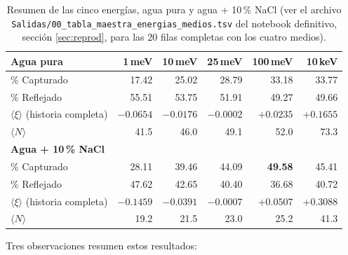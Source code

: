 \documentclass[11pt,a4paper]{article}
\begin{document}
\begin{table}[H]
\centering
\small
\begin{tabularx}{\linewidth}{X r r r r r}
\toprule
\textbf{Agua pura} & \textbf{1\,meV} & \textbf{10\,meV} & \textbf{25\,meV} & \textbf{100\,meV} & \textbf{10\,keV} \\
\midrule
\% Capturado & 17.42 & 25.02 & 28.79 & 33.18 & 33.77 \\
\% Reflejado & 55.51 & 53.75 & 51.91 & 49.27 & 49.66 \\
$\langle\xi\rangle$ (historia completa) & $-0.0654$ & $-0.0176$ & $-0.0002$ & $+0.0235$ & $+0.1655$ \\
$\langle N\rangle$ & 41.5 & 46.0 & 49.1 & 52.0 & 73.3 \\
\midrule
\textbf{Agua + 10\,\% NaCl} & & & & & \\
\midrule
\% Capturado & 28.11 & 39.46 & 44.09 & \textbf{49.58} & 45.41 \\
\% Reflejado & 47.62 & 42.65 & 40.40 & 36.68 & 40.72 \\
$\langle\xi\rangle$ (historia completa) & $-0.1459$ & $-0.0391$ & $-0.0007$ & $+0.0507$ & $+0.3088$ \\
$\langle N\rangle$ & 19.2 & 21.5 & 23.0 & 25.2 & 41.3 \\
\bottomrule
\end{tabularx}
\caption{Resumen de las cinco energías, agua pura y agua + 10\,\% NaCl (ver el archivo
\texttt{Salidas/00\_tabla\_maestra\_energias\_medios.tsv} del notebook definitivo, sección
\ref{sec:reprod}, para las 20 filas completas con los cuatro medios).}
\label{tab:comparativa}
\end{table}

Tres observaciones resumen estos resultados:
\end{document}
